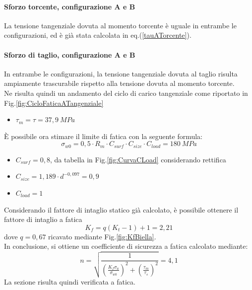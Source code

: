 \paragraph{Sforzo torcente, configurazione A e B} La tensione tangenziale dovuta al momento torcente è uguale in entrambe le configurazioni, ed è già stata calcolata in eq.(\ref{tauATorcente}). 
\paragraph{Sforzo di taglio, configurazione A e B} In entrambe le configurazioni, la tensione tangenziale dovuta al taglio risulta ampiamente trascurabile rispetto alla tensione dovuta al momento torcente. \\
Ne risulta quindi un andamento del ciclo di carico tangenziale come riportato in Fig.\ref{fig:CicloFaticaATangenziale}
\begin{itemize}
    \item $\tau_m=\tau=37,9\ MPa$
\end{itemize}
È possibile ora stimare il limite di fatica con la seguente formula:
\begin{equation}
    \sigma_{w0}=0,5\cdot R_m\cdot C_{surf}\cdot C_{size}\cdot C_{load}=180\ MPa
\end{equation}
\begin{itemize}
    \item $C_{surf}=0,8$, da tabella in Fig.\ref{fig:CurvaCLoad} considerando rettifica 
    \item $C_{size}=1,189\cdot d^{-0,097}=0,9$
    \item $C_{load}=1$
\end{itemize}
Considerando il fattore di intaglio statico già calcolato, è possibile ottenere il fattore di intaglio a fatica
\begin{equation}
    K_f=q\left(K_t-1\right)+1=2,21
\end{equation}
dove $q=0,67$ ricavato mediante Fig.\ref{fig:KfBiella}.\\
In conclusione, si ottiene un coefficiente di sicurezza a fatica calcolato mediante:
\begin{equation}
    n=\sqrt{\frac{1}{\left(\frac{K_f\sigma_a}{\sigma_{w0}}\right)^2+\left(\frac{\tau_m}{\tau_s}\right)^2}}=4,1
\end{equation}
La sezione risulta quindi verificata a fatica.
